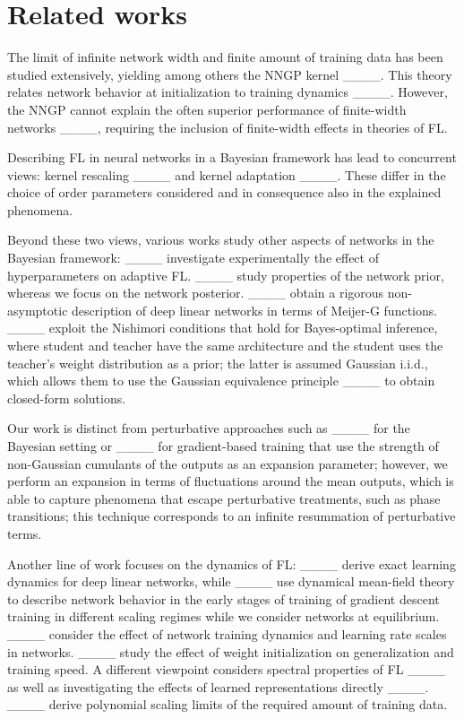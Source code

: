 \section{Related works}
The limit of infinite network width and finite amount of training
data has been studied extensively, yielding among others the NNGP
kernel ____.
This theory relates network behavior at initialization to training
dynamics ____.
However, the NNGP cannot explain the often superior performance of
finite-width networks ____,
requiring the inclusion of finite-width effects in theories of FL.

Describing FL in neural networks in a Bayesian framework has lead
to concurrent views: kernel rescaling ____
and kernel adaptation ____.
These differ in the choice of order parameters considered and in consequence
also in the explained phenomena.

Beyond these two views, various works study other aspects of networks
in the Bayesian framework: ____ investigate experimentally
the effect of hyperparameters on adaptive FL. ____
study properties of the network prior, whereas we focus on the network
posterior. ____ obtain a rigorous non-asymptotic description
of deep linear networks in terms of Meijer-G functions. ____
exploit the Nishimori conditions that hold for Bayes-optimal inference,
where student and teacher have the same architecture and the student
uses the teacher's weight distribution as a prior; the latter is assumed
Gaussian i.i.d., which allows them to use the Gaussian equivalence
principle ____ to obtain closed-form solutions.

Our work is distinct from perturbative approaches such as ____
for the Bayesian setting or ____
for gradient-based training that use the strength of non-Gaussian
cumulants of the outputs as an expansion parameter; however, we perform
an expansion in terms of fluctuations around the mean outputs, which
is able to capture phenomena that escape perturbative treatments,
such as phase transitions; this technique corresponds to an infinite
resummation of perturbative terms.

Another line of work focuses on the dynamics of FL: ____
derive exact learning dynamics for deep linear networks, while ____
use dynamical mean-field theory to describe network behavior in the
early stages of training of gradient descent training in different
scaling regimes while we consider networks at equilibrium. ____
consider the effect of network training dynamics and learning rate
scales in networks. ____ study the effect of weight initialization
on generalization and training speed. A different viewpoint considers
spectral properties of FL ____ as well as investigating
the effects of learned representations directly ____.
____ derive polynomial scaling limits of the required
amount of training data.